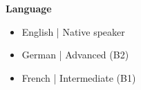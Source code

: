 \textcolor{accentcolor}{\textbf{\large {Language}}} \\[0.2cm]

\begin{itemize}[left=0pt]
    \item English | Native speaker
    \item German | Advanced (B2)
    \item French | Intermediate (B1)
\end{itemize}